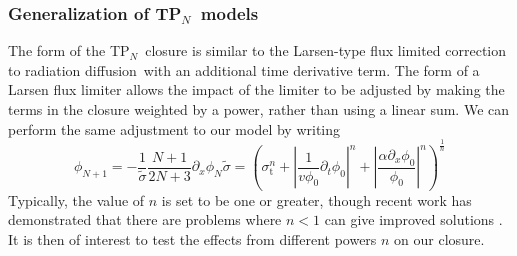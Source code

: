 \documentclass[review]{elsarticle}
\newcommand{\pn}{P$_N$}
\newcommand{\ppz}{\partial_x}%
\newcommand{\psii}[1]{\phi_\ensuremath{{#1}}}
\begin{document}
\subsubsection{Generalization of T\pn\ models}
{
The form of the T\pn~closure is similar to the Larsen-type flux limited correction to radiation diffusion\cite{Morel:2000vh}\  with an additional time derivative term. The form of a Larsen flux limiter allows the impact of the limiter to be adjusted by making the terms in the closure weighted by a power, rather than using a linear sum.  We can perform the same adjustment to our model by writing
\begin{subequations}
	\begin{equation}
	\psii{N+1}=-\frac{1}{\tilde{\sigma}}\frac{N+1}{2N+3}\ppz\psii{N}
	\end{equation}
	\begin{equation}\label{eq:fluxLim}
	\tilde{\sigma}=\left(\sigma_\mathrm{t}^n+\displaystyle\left|\frac{1}{v\psii{0}}\partial_t\psii{0}\right|^n+\left|\frac{\alpha\partial_x\psii{0}}{\psii{0}}\right|^n\right)^{\frac{1}{n}}
	\end{equation}
\end{subequations}
Typically, the value of $n$ is set to be one or greater, though recent work has demonstrated that there are problems where $n<1$ can give improved solutions \cite{taylor_ans12}. It is then of interest to test the effects from different powers $n$ on our closure.
	}
\end{document}
